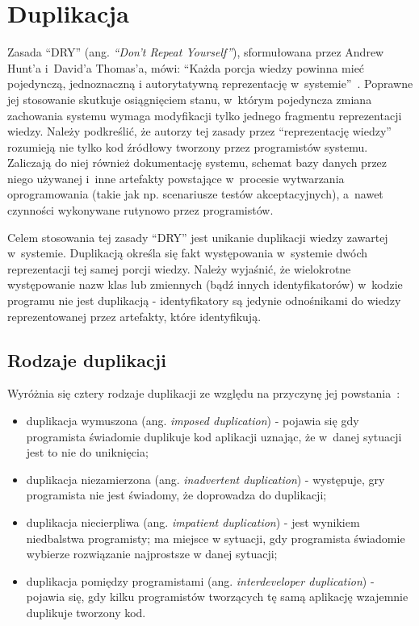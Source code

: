 \chapter{Duplikacja} \label{chap:duplication}

Zasada ``DRY'' (ang. \emph{``Don't Repeat Yourself''}), sformułowana przez Andrew Hunt'a i~David'a Thomas'a, mówi: ``Każda porcja wiedzy powinna mieć pojedynczą, jednoznaczną i autorytatywną reprezentację w~systemie''~\cite{prag_prog:dupl}.
Poprawne jej stosowanie skutkuje osiągnięciem stanu, w~którym pojedyncza zmiana zachowania systemu wymaga modyfikacji tylko jednego fragmentu reprezentacji wiedzy.
Należy podkreślić, że autorzy tej zasady przez ``reprezentację wiedzy'' rozumieją nie tylko kod źródłowy tworzony przez programistów systemu.
Zaliczają do niej również dokumentację systemu, schemat bazy danych przez niego używanej i~inne artefakty powstające w~procesie wytwarzania oprogramowania (takie jak np. scenariusze testów akceptacyjnych), a~nawet czynności wykonywane rutynowo przez programistów.

Celem stosowania tej zasady ``DRY'' jest unikanie duplikacji wiedzy zawartej w~systemie.
Duplikacją określa się fakt występowania w~systemie dwóch reprezentacji tej samej porcji wiedzy.
Należy wyjaśnić, że wielokrotne występowanie nazw klas lub zmiennych (bądź innych identyfikatorów) w~kodzie programu nie jest duplikacją - identyfikatory są jedynie odnośnikami do wiedzy reprezentowanej przez artefakty, które identyfikują.



\section{Rodzaje duplikacji}

Wyróżnia się cztery rodzaje duplikacji ze względu na przyczynę jej powstania~\cite{prag_prog:dupl}:

\begin{itemize}
 \item duplikacja wymuszona (ang. \emph{imposed duplication}) - pojawia się gdy programista świadomie duplikuje kod aplikacji uznając, że w~danej sytuacji jest to nie do uniknięcia;
 \item duplikacja niezamierzona (ang. \emph{inadvertent duplication}) - występuje, gry programista nie jest świadomy, że doprowadza do duplikacji;
 \item duplikacja niecierpliwa (ang. \emph{impatient duplication}) - jest wynikiem niedbalstwa programisty; ma miejsce w sytuacji, gdy programista świadomie wybierze rozwiązanie najprostsze w danej sytuacji;
 \item duplikacja pomiędzy programistami (ang. \emph{interdeveloper duplication}) - pojawia się, gdy kilku programistów tworzących tę samą aplikację wzajemnie duplikuje tworzony kod.
\end{itemize}

